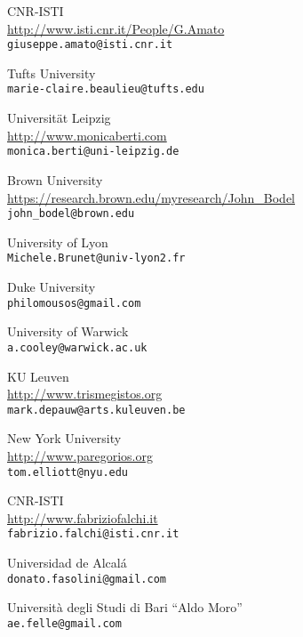 \begin{contributors}


{ CNR-ISTI	  \\
\url{http://www.isti.cnr.it/People/G.Amato }\\
\texttt{giuseppe.amato@isti.cnr.it}
}

{   Tufts University	\\
\texttt{marie-claire.beaulieu@tufts.edu}
}
	

{ Universität Leipzig  \\
\url{http://www.monicaberti.com} \\
\texttt{monica.berti@uni-leipzig.de}
}

		
{ Brown University	  \\
\url{https://research.brown.edu/myresearch/John_Bodel} \\
\texttt{john_bodel@brown.edu}
}
			
			
{  University of Lyon \\
\texttt{Michele.Brunet@univ-lyon2.fr}
}
	
	
{  Duke University	 \\
\texttt{philomousos@gmail.com}
}
	
			
{ University of Warwick	  \\
\texttt{a.cooley@warwick.ac.uk}
}


{ KU Leuven	  \\
\url{http://www.trismegistos.org}	 \\
\texttt{mark.depauw@arts.kuleuven.be}
}
		

{ New York University  \\
\url{http://www.paregorios.org} \\
\texttt{tom.elliott@nyu.edu}
}
	
	
{  CNR-ISTI	 \\
\url{http://www.fabriziofalchi.it} \\
\texttt{fabrizio.falchi@isti.cnr.it}
}
	
{ Universidad de Alcalá	  \\
\texttt{donato.fasolini@gmail.com	}
}
	
	
{  Università degli Studi di Bari ``Aldo Moro'' \\
\texttt{ae.felle@gmail.com}
}



\end{contributors}

